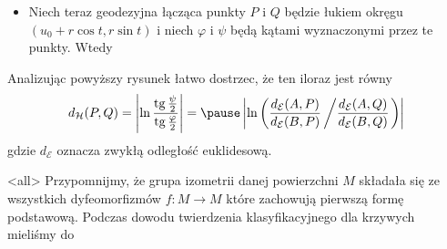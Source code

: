\begin{frame}

\begin{itemize}

\item Niech teraz geodezyjna łącząca punkty $P$ i $Q$ będzie łukiem okręgu $(u_0+r\cos t,r\sin t)$ i niech $\varphi$ i $\psi$ będą kątami wyznaczonymi przez te punkty. \pause Wtedy

\end{itemize}

\end{frame}
\begin{frame}
\begin{center}

\end{center}
Analizując powyższy rysunek łatwo dostrzec, że ten iloraz jest równy
\[d_{\mathcal{H}}(P,Q)=\le|\ln \frac{\operatorname{tg} \frac{\psi}{2}}{\operatorname{tg} \frac{\varphi}{2}}\ri|=\pause\le|\ln \le(\frac{d_{\mathcal{E}}(A,P)}{d_{\mathcal{E}}(B,P)}\le/\frac{d_{\mathcal{E}}(A,Q)}{d_{\mathcal{E}}(B,Q)}\ri.\ri)\ri|\]
gdzie $d_{\mathcal{E}}$ oznacza zwykłą odległość euklidesową.
\end{frame}
\mode<all>{}
Przypomnijmy, że grupa izometrii danej powierzchni $M$ składała się ze 
wszystkich dyfeomorfizmów $f\colon M\to M$ które zachowują pierwszą formę 
podstawową. Podczas dowodu twierdzenia klasyfikacyjnego dla krzywych mieliśmy do 

